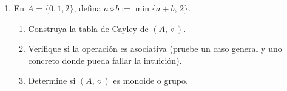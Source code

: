 \begin{enumerate}[label=\textbf{1.\arabic*.}]
\textbf{Solución.}
\begin{enumerate}[label=\alph*)]
    \item
    \[
    \begin{array}{c|ccc}
        \star & 0 & 1 & 2 \\ \hline
        0     & 0 & 1 & 2 \\
        1     & 1 & 1 & 2 \\
        2     & 2 & 2 & 2
    \end{array}
    \]
    \item Sí, pues \(\max\{a,b\} = \max\{b,a\}\). La operación es \textbf{conmutativa}.
    \item Buscamos \(e\) con \(\max\{e,a\} = a\) para todo \(a\). Esto exige
    \(e \leq a\) para todo \(a \in \{0,1,2\}\), luego \(e = 0\).
    Verificamos: \(\max\{0,a\} = a\) \checkmark.
    \item El elemento \(2\) no tiene inverso: se necesitaría \(b\) con
    \(\max\{2,b\} = 0\), lo que es imposible pues \(\max\{2,b\} \geq 2 > 0\).
    \textbf{\((A,\star)\) es un monoide conmutativo, pero no es un grupo.} \hfill\(\square\)
\end{enumerate}

\item En \(A = \{0,1,2\}\), defina \(a \diamond b := \min\{a+b,\,2\}\).
\begin{enumerate}[label=\alph*)]
    \item Construya la tabla de Cayley de \((A,\diamond)\).
    \item Verifique si la operación es asociativa (pruebe un caso general y
    uno concreto donde pueda fallar la intuición).
    \item Determine si \((A,\diamond)\) es monoide o grupo.
\end{enumerate}


\end{enumerate}
